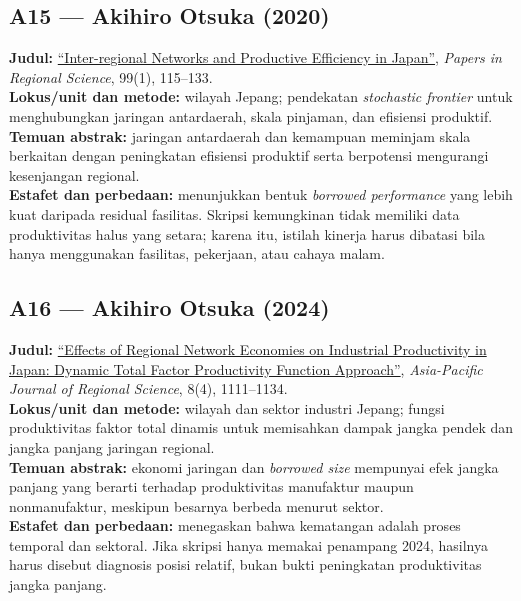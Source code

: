 \documentclass[
  indonesian,
  11pt,
  a4paper,
  oneside,
  openany]{report}
\begin{document}
\subsection{A15 --- Akihiro Otsuka
(2020)}\label{a15-akihiro-otsuka-2020}

\textbf{Judul:}
\href{https://doi.org/10.1111/pirs.12474}{``Inter-regional Networks and
Productive Efficiency in Japan''}, \emph{Papers in Regional Science},
99(1), 115--133.\\
\textbf{Lokus/unit dan metode:} wilayah Jepang; pendekatan
\emph{stochastic frontier} untuk menghubungkan jaringan antardaerah,
skala pinjaman, dan efisiensi produktif.\\
\textbf{Temuan abstrak:} jaringan antardaerah dan kemampuan meminjam
skala berkaitan dengan peningkatan efisiensi produktif serta berpotensi
mengurangi kesenjangan regional.\\
\textbf{Estafet dan perbedaan:} menunjukkan bentuk \emph{borrowed
performance} yang lebih kuat daripada residual fasilitas. Skripsi
kemungkinan tidak memiliki data produktivitas halus yang setara; karena
itu, istilah kinerja harus dibatasi bila hanya menggunakan fasilitas,
pekerjaan, atau cahaya malam.

\subsection{A16 --- Akihiro Otsuka
(2024)}\label{a16-akihiro-otsuka-2024}

\textbf{Judul:}
\href{https://doi.org/10.1007/s41685-024-00358-2}{``Effects of Regional
Network Economies on Industrial Productivity in Japan: Dynamic Total
Factor Productivity Function Approach''}, \emph{Asia-Pacific Journal of
Regional Science}, 8(4), 1111--1134.\\
\textbf{Lokus/unit dan metode:} wilayah dan sektor industri Jepang;
fungsi produktivitas faktor total dinamis untuk memisahkan dampak jangka
pendek dan jangka panjang jaringan regional.\\
\textbf{Temuan abstrak:} ekonomi jaringan dan \emph{borrowed size}
mempunyai efek jangka panjang yang berarti terhadap produktivitas
manufaktur maupun nonmanufaktur, meskipun besarnya berbeda menurut
sektor.\\
\textbf{Estafet dan perbedaan:} menegaskan bahwa kematangan adalah
proses temporal dan sektoral. Jika skripsi hanya memakai penampang 2024,
hasilnya harus disebut diagnosis posisi relatif, bukan bukti peningkatan
produktivitas jangka panjang.
\end{document}
